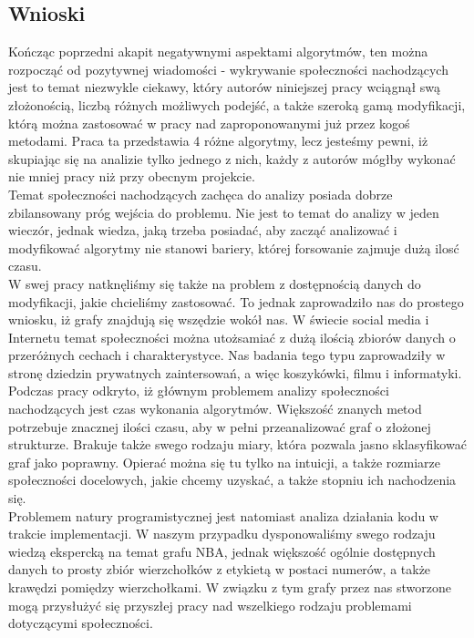 \documentclass{article}
\begin{document}
\subsection{Wnioski}
Kończąc poprzedni akapit negatywnymi aspektami algorytmów, ten można rozpocząć od pozytywnej wiadomości - wykrywanie społeczności nachodzących jest to temat niezwykle ciekawy, który autorów niniejszej pracy wciągnął swą złożonością, liczbą różnych możliwych podejść, a także szeroką gamą modyfikacji, którą można zastosować w pracy nad zaproponowanymi już przez kogoś metodami. Praca ta przedstawia 4 różne algorytmy, lecz jesteśmy pewni, iż skupiając się na analizie tylko jednego z nich, każdy z autorów mógłby wykonać nie mniej pracy niż przy obecnym projekcie. \\

Temat społeczności nachodzących zachęca do analizy posiada dobrze zbilansowany próg wejścia do problemu. Nie jest to temat do analizy w jeden wieczór, jednak wiedza, jaką trzeba posiadać, aby zacząć analizować i modyfikować algorytmy nie stanowi bariery, której forsowanie zajmuje dużą ilosć czasu. \\

W swej pracy natknęliśmy się także na problem z dostępnością danych do modyfikacji, jakie chcieliśmy zastosować. To jednak zaprowadziło nas do prostego wniosku, iż grafy znajdują się wszędzie wokół nas. W świecie social media i Internetu temat społeczności można utożsamiać z dużą ilością zbiorów danych o przeróżnych cechach i charakterystyce. Nas badania tego typu zaprowadziły w stronę dziedzin prywatnych zaintersowań, a więc koszykówki, filmu i informatyki. \\

Podczas pracy odkryto, iż głównym problemem analizy społeczności nachodzących jest czas wykonania algorytmów. Większość znanych metod potrzebuje znacznej ilości czasu, aby w pełni przeanalizować graf o złożonej strukturze. Brakuje także swego rodzaju miary, która pozwala jasno sklasyfikować graf jako poprawny. Opierać można się tu tylko na intuicji, a także rozmiarze społeczności docelowych, jakie chcemy uzyskać, a także stopniu ich nachodzenia się. \\

Problemem natury programistycznej jest natomiast analiza działania kodu w trakcie implementacji. W naszym przypadku dysponowaliśmy swego rodzaju wiedzą ekspercką na temat grafu NBA, jednak większość ogólnie dostępnych danych to prosty zbiór wierzchołków z etykietą w postaci numerów, a także krawędzi pomiędzy wierzchołkami. W związku z tym grafy przez nas stworzone mogą przysłużyć się przyszłej pracy nad wszelkiego rodzaju problemami dotyczącymi społeczności. \\
\end{document}
